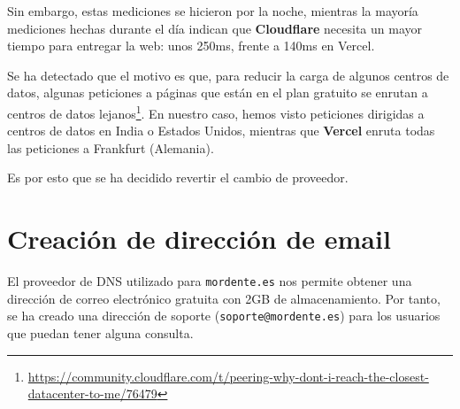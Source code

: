 Sin embargo, estas mediciones se hicieron por la noche, mientras la mayoría mediciones hechas durante el día indican que \textbf{Cloudflare} necesita un mayor tiempo para entregar la web: unos 250ms, frente a 140ms en Vercel.

Se ha detectado que el motivo es que, para reducir la carga de algunos centros de datos, algunas peticiones a páginas que están en el plan gratuito se enrutan a centros de datos lejanos\footnote{\url{https://community.cloudflare.com/t/peering-why-dont-i-reach-the-closest-datacenter-to-me/76479}}. En nuestro caso, hemos visto peticiones dirigidas a centros de datos en India o Estados Unidos, mientras que \textbf{Vercel} enruta todas las peticiones a Frankfurt (Alemania).

Es por esto que se ha decidido revertir el cambio de proveedor.


\section{Creación de dirección de email}

El proveedor de DNS utilizado para \texttt{mordente.es} nos permite obtener una dirección de correo electrónico gratuita con 2GB de almacenamiento. Por tanto, se ha creado una dirección 
de soporte (\texttt{soporte@mordente.es}) para los usuarios que puedan tener alguna consulta.


